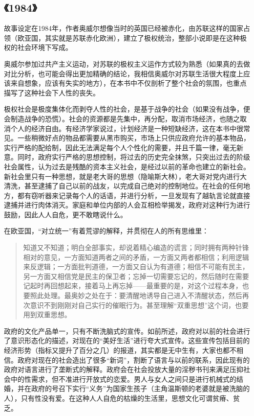 \subsection{《1984》}

故事设定在1984年，作者奥威尔想像当时的英国已经被赤化，由苏联这样的国家占领（欧亚国，其实就是苏联赤化欧洲），建立了极权统治，整部小说即是在这种极权的社会环境下写成。

奥威尔参加过共产主义运动，对苏联的极权主义运作方式较为熟悉（如果真的去做对比分析，也可能会得出更加精确的结论，我相信奥威尔对苏联生活很大程度上应该来自想象，应该有失实的地方），在本书中不仅剖析了整个社会的氛围，也重点描写了这种社会下人性的丧失。

极权社会是极度集体化而剥夺人性的社会，是基于战争的社会（如果没有战争，便会制造战争的恐慌）。社会的资源都是先集中，再分配，取消市场经济，也随之取消个人的经济自由。有经济学家说过，计划经济是一种短缺经济，这在本书中很常见。一些稍微好点的物品都需要从黑市购买，市场上只供应政府允许的基本物品，实行严格的配给制，因此无法满足每个人个性化的需要，并且千篇一律，毫无新意。同时，政府实行严格的思想控制，将过去的历史完全抹煞，只突出过去的阶级社会属性，认为过去是残酷的资本主义社会，是经过以前的革命也建立的新社会。新社会里只有一种思想，就是老大哥的思想（隐喻斯大林），老大哥对党内进行大清洗，甚至逮捕了自己以前的战友，以完成自己绝对的控制地位。在社会的任何地方，都有窃听器来记录每个人的话语，并进行分析，一旦发现有了越轨言论就直接逮捕并进行肉体消灭。家庭和单位内部的人会互相检举揭发，政府对这种行为进行鼓励，因此人人自危，更不敢瞎说什么。

在欧亚国，“对立统一”有着荒谬的解释，并贯彻在人的所有思维里：
\begin{quotation}
知道又不知道；明白全部事实，却说着精心编造的谎言；同时拥有两种针锋相对的意见，一方面知道两者之间的矛盾，一方面又两者都相信；利用逻辑来反逻辑；一方面批判道德，一方面又自认为有道德；相信不可能有民主，另一方面又相信党是民主的保卫者；忘掉一切需要忘记的，然后随时在需要记起时再回想起来，接着马上再忘掉——最重要的是，对这个过程本身，也要照此处理。最奥妙之处在于：要清醒地诱导自己进入不清醒状态，然后再次意识不到刚刚对自己实行的催眠行为。甚至理解“双重思想”这个词，也要用到双重思想。
\end{quotation}


政府的文化产品单一，只有不断洗脑式的宣传。如前所述，政府对以前的社会进行了意识形态化的描述，对现在的“美好生活”进行夸大式宣传。这些宣传包括目前的经济形势（指标又提升了百分之几）的报道，其实都是无中生有，大家也都不相信。政府对现在的社会造出了很多“新词”，割断了语言与以前的联系，因此现有的政府对语言进行了垄断式的解释。政府会在社会投放大量的淫秽书刊来满足压抑社会中的性需求，但不准进行开放式的恋爱。男人与女人之间只是进行机械式的结婚，并在政府的号召下实行“义务”为国家生孩子（主角温斯顿的老婆就是被洗脑的人），只有性没有爱。在这种人人自危的枯燥的生活里，思想文化可谓贫瘠、贫乏。

